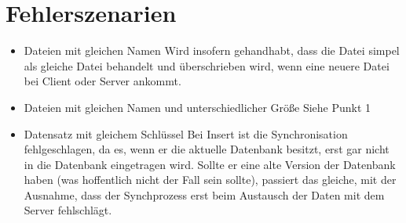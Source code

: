\documentclass[a4paper,12pt]{scrreprt}
\begin{document}
\section{Fehlerszenarien}
\begin{itemize}
\item Dateien mit gleichen Namen
\subitem Wird insofern gehandhabt, dass die Datei simpel als gleiche Datei behandelt und überschrieben wird, wenn eine neuere Datei bei Client oder Server ankommt.
\item Dateien mit gleichen Namen und unterschiedlicher Größe
\subitem Siehe Punkt 1
\item Datensatz mit gleichem Schlüssel
\subitem Bei Insert ist die Synchronisation fehlgeschlagen, da es, wenn er die aktuelle Datenbank besitzt, erst gar nicht in die Datenbank eingetragen wird. Sollte er eine alte Version der Datenbank haben (was hoffentlich nicht der Fall sein sollte), passiert das gleiche, mit der Ausnahme, dass der Synchprozess erst beim Austausch der Daten mit dem Server fehlschlägt.
\end{itemize}
 
 
\end{document}

